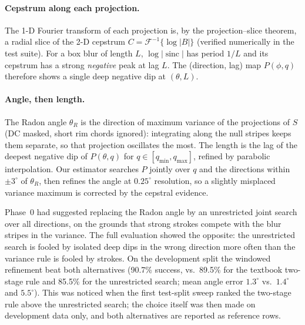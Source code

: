 \paragraph{Cepstrum along each projection.} The 1-D Fourier transform of each projection is,
by the projection--slice theorem, a radial slice of the 2-D cepstrum
$C = \mathcal{F}^{-1}\{\log|B|\}$ (verified numerically in the test suite). For a box blur of
length $L$, $\log|\operatorname{sinc}|$ has period $1/L$ and its cepstrum has a strong
\emph{negative} peak at lag $L$. The (direction, lag) map
$P(\phi, q)$ therefore shows a single deep negative dip at $(\theta, L)$.

\paragraph{Angle, then length.} The Radon angle $\theta_R$ is the direction of maximum variance
of the projections of $S$ (DC masked, short rim chords ignored): integrating along the null
stripes keeps them separate, so that projection oscillates the most. The length is the lag of the
deepest negative dip of $P(\theta, q)$ for $q\in[q_{\min}, q_{\max}]$, refined by parabolic
interpolation. Our estimator searches $P$ jointly over $q$ and the directions within
$\pm3^\circ$ of $\theta_R$, then refines the angle at $0.25^\circ$ resolution, so a slightly
misplaced variance maximum is corrected by the cepstral evidence.

Phase~0 had suggested replacing the Radon angle by an unrestricted joint search over all
directions, on the grounds that strong strokes compete with the blur stripes in the variance. The
full evaluation showed the opposite: the unrestricted search is fooled by isolated deep dips in
the wrong direction more often than the variance rule is fooled by strokes. On the development
split the windowed refinement beat both alternatives (90.7\% success, vs.\ 89.5\% for the textbook
two-stage rule and 85.5\% for the unrestricted search; mean angle error $1.3^\circ$ vs.\
$1.4^\circ$ and $5.5^\circ$). This was noticed when the first test-split sweep ranked the
two-stage rule above the unrestricted search; the choice itself was then made on development data
only, and both alternatives are reported as reference rows.


